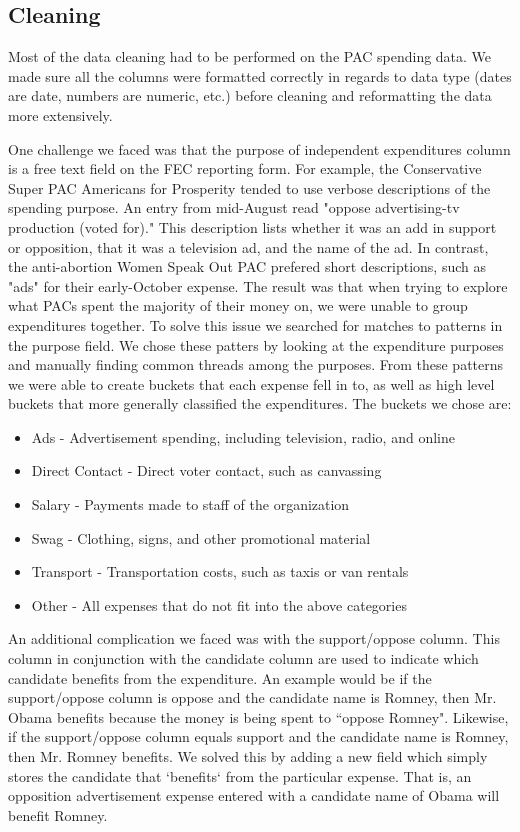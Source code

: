 \documentclass[11pt]{article}\usepackage{graphicx, color}
\begin{document}
\subsection{Cleaning}
Most of the data cleaning had to be performed on the PAC spending data. We made sure all the columns were formatted correctly in regards to data type (dates are date, numbers are numeric, etc.) before cleaning and reformatting the data more extensively. 

One challenge we faced was that the purpose of independent expenditures column is a free text field on the FEC reporting form. For example, the Conservative Super PAC Americans for Prosperity tended to use verbose descriptions of the spending purpose.  An entry from mid-August read "oppose advertising-tv production (voted for)."  This description lists whether it was an add in support or opposition, that it was a television ad, and the name of the ad. In contrast, the anti-abortion Women Speak Out PAC prefered short descriptions, such as "ads" for their early-October expense. The result was that when trying to explore what PACs spent the majority of their money on, we were unable to group expenditures together. To solve this issue we searched for matches to patterns in the purpose field. We chose these patters by looking at the expenditure purposes and manually finding common threads among the purposes. From these patterns we were able to create buckets that each expense fell in to, as well as high level buckets that more generally classified the expenditures.  The buckets we chose are: 

\begin{itemize}
    \item Ads - Advertisement spending, including television, radio, and online
    \item Direct Contact - Direct voter contact, such as canvassing
    \item Salary - Payments made to staff of the organization
    \item Swag - Clothing, signs, and other promotional material
    \item Transport - Transportation costs, such as taxis or van rentals
    \item Other - All expenses that do not fit into the above categories
\end{itemize}

An additional complication we faced was with the support/oppose column. This column in conjunction with the candidate column are used to indicate which candidate benefits from the expenditure. An example would be if the support/oppose column is oppose and the candidate name is Romney, then Mr. Obama benefits because the money is being spent to ``oppose Romney". Likewise, if the support/oppose column equals support and the candidate name is Romney, then Mr. Romney benefits.  We solved this by adding a new field which simply stores the candidate that `benefits` from the particular expense.  That is, an opposition advertisement expense entered with a candidate name of Obama will benefit Romney.
\end{document}
